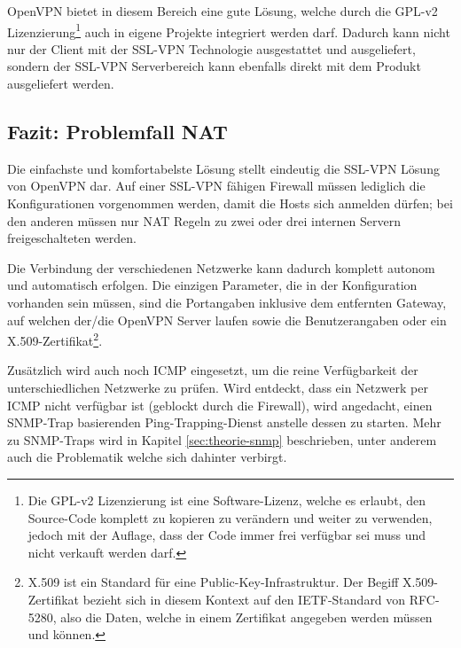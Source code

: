 OpenVPN\cite{openvpn} bietet in diesem Bereich eine gute L\"osung, welche durch die GPL-v2 Lizenzierung\footnote{Die GPL-v2 Lizenzierung ist eine Software-Lizenz, welche es erlaubt, den Source-Code komplett zu kopieren zu ver\"andern und weiter zu verwenden, jedoch mit der Auflage, dass der Code immer frei verf\"ugbar sei muss und nicht verkauft werden darf.} auch in eigene Projekte integriert werden darf. Dadurch kann nicht nur der Client mit der SSL-VPN Technologie ausgestattet und ausgeliefert, sondern der SSL-VPN Serverbereich kann ebenfalls direkt mit dem Produkt ausgeliefert werden.

\subsection{Fazit: Problemfall NAT} \label{sec:theorie-nat-fazit}    
Die einfachste und komfortabelste L\"osung stellt eindeutig die SSL-VPN L\"osung von OpenVPN dar. Auf einer SSL-VPN f\"ahigen Firewall m\"ussen lediglich die Konfigurationen vorgenommen werden, damit die Hosts sich anmelden d\"urfen; bei den anderen m\"ussen nur NAT Regeln zu zwei oder drei internen Servern freigeschalteten werden.

Die Verbindung der verschiedenen Netzwerke kann dadurch komplett autonom und automatisch erfolgen. Die einzigen Parameter, die in der Konfiguration vorhanden sein m\"ussen, sind die Portangaben inklusive dem entfernten Gateway, auf welchen der/die OpenVPN Server laufen sowie die Benutzerangaben oder ein X.509-Zertifikat\footnote{X.509 ist ein Standard f\"ur eine Public-Key-Infrastruktur. Der Begiff X.509-Zertifikat bezieht sich in diesem Kontext auf den IETF-Standard von RFC-5280\cite{rfc5280}, also die Daten, welche in einem Zertifikat angegeben werden m\"ussen und k\"onnen.}.

Zus\"atzlich wird auch noch ICMP eingesetzt, um die reine Verf\"ugbarkeit der unterschiedlichen Netzwerke zu pr\"ufen. Wird entdeckt, dass ein Netzwerk per ICMP nicht verf\"ugbar ist (geblockt durch die Firewall), wird angedacht, einen SNMP-Trap basierenden Ping-Trapping-Dienst anstelle dessen zu starten. Mehr zu SNMP-Traps wird in Kapitel \ref{sec:theorie-snmp} beschrieben, unter anderem auch die Problematik welche sich dahinter verbirgt.

